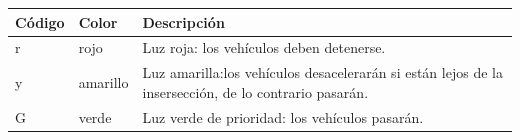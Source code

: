 \begin{longtable}[]{@{}lll@{}}
\toprule
\begin{minipage}[b]{0.09\columnwidth}\raggedright
Código\strut
\end{minipage} & \begin{minipage}[b]{0.09\columnwidth}\raggedright
Color\strut
\end{minipage} & \begin{minipage}[b]{0.73\columnwidth}\raggedright
Descripción\strut
\end{minipage}\tabularnewline
\midrule
\endhead
\begin{minipage}[t]{0.09\columnwidth}\raggedright
r\strut
\end{minipage} & \begin{minipage}[t]{0.09\columnwidth}\raggedright
rojo\strut
\end{minipage} & \begin{minipage}[t]{0.73\columnwidth}\raggedright
Luz roja: los vehículos deben detenerse.\strut
\end{minipage}\tabularnewline
\begin{minipage}[t]{0.09\columnwidth}\raggedright
y\strut
\end{minipage} & \begin{minipage}[t]{0.09\columnwidth}\raggedright
amarillo\strut
\end{minipage} & \begin{minipage}[t]{0.73\columnwidth}\raggedright
Luz amarilla:los vehículos desacelerarán si están lejos de la
insersección, de lo contrario pasarán.\strut
\end{minipage}\tabularnewline
\begin{minipage}[t]{0.09\columnwidth}\raggedright
G\strut
\end{minipage} & \begin{minipage}[t]{0.09\columnwidth}\raggedright
verde\strut
\end{minipage} & \begin{minipage}[t]{0.73\columnwidth}\raggedright
Luz verde de prioridad: los vehículos pasarán.\strut
\end{minipage}\tabularnewline
\bottomrule
\end{longtable}

